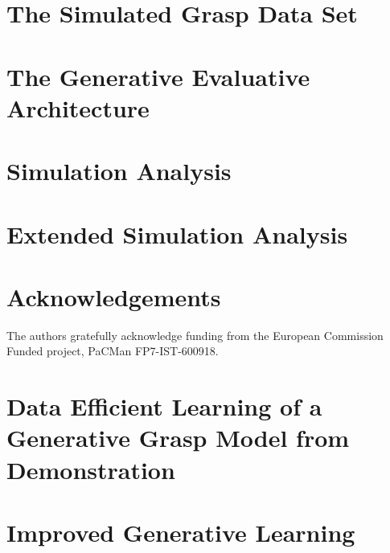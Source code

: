 \documentclass{ws-ijhr}
\begin{document}


\section{The Simulated Grasp Data Set}
\label{section:simulation}


\section{The Generative Evaluative Architecture} \label{section:evaluative}



\section{Simulation Analysis}
\label{section:simulationAnalysis}


\section{Extended Simulation Analysis}
\label{section:extendedSimulationAnalysis}


\section*{Acknowledgements}

The authors gratefully acknowledge funding from the European Commission Funded project, PaCMan FP7-IST-600918.

\appendix

\section{Data Efficient Learning of a Generative Grasp Model from Demonstration}

 \label{section:generative}

\section{Improved Generative Learning}

 \label{section:generative_new}
\end{document}
